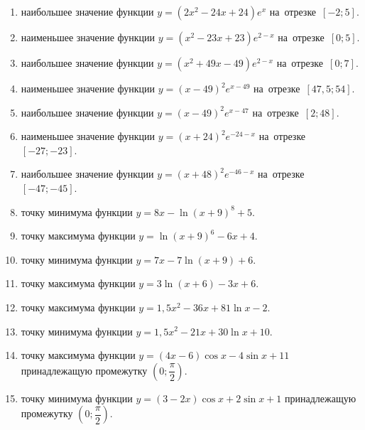 \documentclass[a4paper,10pt]{article}
\begin{document}
\begin{enumerate}
\item {} наибольшее значение функции $y=\left(2x^2 -24x +24\right)e^{x}$ на~отрезке~$\left[-2;5\right]$.

\item {} наименьшее значение функции $y=\left(x^2 -23x +23\right)e^{2-x}$ на~отрезке~$\left[0;5\right]$.

\item {} наибольшее значение функции $y=\left(x^2 +49x -49\right)e^{2-x}$ на~отрезке~$\left[0;7\right]$.

\item {} наименьшее значение функции $y=\left(x-49\right)^2e^{x-49}$ на~отрезке~$\left[47,5;54\right]$.

\item {} наибольшее значение функции $y=\left(x-49\right)^2e^{x-47}$ на~отрезке~$\left[2;48\right]$.

\item {} наименьшее значение функции $y=\left(x+24\right)^2e^{-24-x}$ на~отрезке~$\left[-27;-23\right]$.

\item {} наибольшее значение функции $y=\left(x+48\right)^2e^{-46-x}$ на~отрезке~$\left[-47;-45\right]$.

\item {} точку минимума функции $y=8x-\ln\left(x+9\right)^{8}+5$.

\item {} точку максимума функции $y=\ln\left(x+9\right)^{6}-6x+4$.

\item {} точку минимума функции $y=7x-7\ln\left(x+9\right)+6$.

\item {} точку максимума функции $y=3\ln\left(x+6\right)-3x+6$.

\item {} точку максимума функции $y=1,5x^2-36x+81\ln x -2$.

\item {} точку минимума функции $y=1,5x^2-21x+30\ln x +10$.

\item {} точку максимума функции $y=\left(4x-6\right)\cos x -4\sin x+11$
принадлежащую промежутку $\left(0;\dfrac{\pi}{2}\right)$.

\item {} точку минимума функции $y=\left(3-2x\right)\cos x +2\sin x+1$
принадлежащую промежутку $\left(0;\dfrac{\pi}{2}\right)$.


\end{enumerate}
\end{document}
